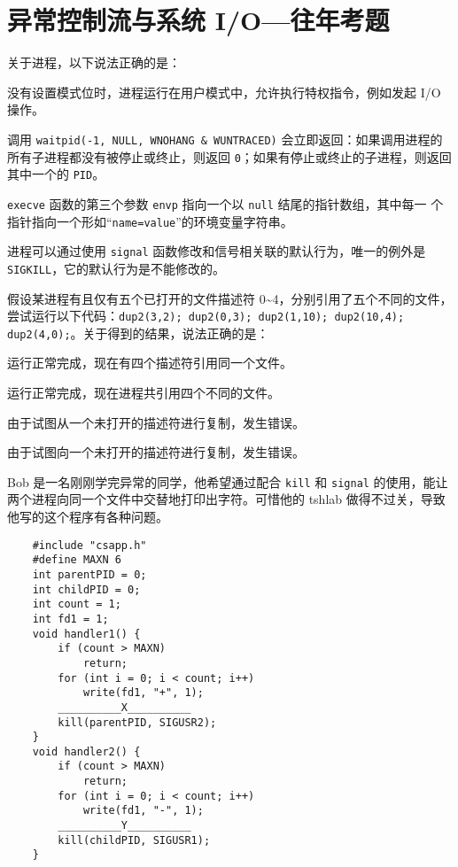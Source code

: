 \chapter{异常控制流与系统 I/O{---}往年考题}\thispagestyle{empty}
    \begin{problems}
         关于进程，以下说法正确的是：
        \begin{choices}
            \item 没有设置模式位时，进程运行在用户模式中，允许执行特权指令，例如发起 I/O 操作。
            \item 调用 \verb|waitpid(-1, NULL, WNOHANG & WUNTRACED)| 会立即返回：如果调用进程的所有子进程都没有被停止或终止，则返回 \verb|0|；如果有停止或终止的子进程，则返回其中一个的 \verb|PID|。
            \item \verb|execve| 函数的第三个参数 \verb|envp| 指向一个以 \verb|null| 结尾的指针数组，其中每一 个指针指向一个形如“\verb|name=value|”的环境变量字符串。
            \item 进程可以通过使用 \verb|signal| 函数修改和信号相关联的默认行为，唯一的例外是 \verb|SIGKILL|，它的默认行为是不能修改的。
        \end{choices}
         假设某进程有且仅有五个已打开的文件描述符 0\textasciitilde4，分别引用了五个不同的文件，尝试运行以下代码：\verb|dup2(3,2); dup2(0,3); dup2(1,10); dup2(10,4); dup2(4,0);|。关于得到的结果，说法正确的是：
        \begin{choices}
            \item 运行正常完成，现在有四个描述符引用同一个文件。
            \item 运行正常完成，现在进程共引用四个不同的文件。
            \item 由于试图从一个未打开的描述符进行复制，发生错误。
            \item 由于试图向一个未打开的描述符进行复制，发生错误。
        \end{choices}
         Bob 是一名刚刚学完异常的同学，他希望通过配合 \verb|kill| 和 \verb|signal| 的使用，能让两个进程向同一个文件中交替地打印出字符。可惜他的 tshlab 做得不过关，导致他写的这个程序有各种问题。
        \begin{verbatim}
    #include "csapp.h"
    #define MAXN 6
    int parentPID = 0;
    int childPID = 0;
    int count = 1;
    int fd1 = 1;
    void handler1() {
        if (count > MAXN)
            return;
        for (int i = 0; i < count; i++)
            write(fd1, "+", 1);
        __________X__________
        kill(parentPID, SIGUSR2);
    }
    void handler2() {
        if (count > MAXN)
            return;
        for (int i = 0; i < count; i++)
            write(fd1, "-", 1);
        __________Y__________
        kill(childPID, SIGUSR1);
    }


\end{verbatim}
\end{problems}
